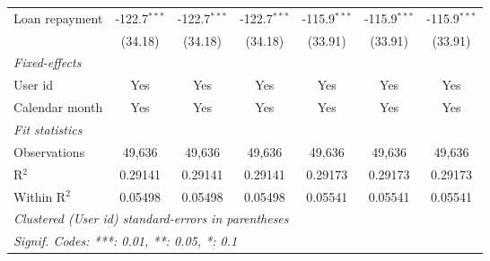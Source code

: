 \begin{table}[htbp]
\begin{footnotesize}
\begin{tabular}{lcccccc}
         Loan repayment                   & -122.7$^{***}$ & -122.7$^{***}$ & -122.7$^{***}$ & -115.9$^{***}$ & -115.9$^{***}$  & -115.9$^{***}$\\
                                          & (34.18)        & (34.18)        & (34.18)        & (33.91)        & (33.91)         & (33.91)\\
         \midrule \emph{Fixed-effects} &   &   &   &   &   &  \\
         User id                          & Yes            & Yes            & Yes            & Yes            & Yes             & Yes\\
         Calendar month                   & Yes            & Yes            & Yes            & Yes            & Yes             & Yes\\
         \midrule \emph{Fit statistics} &   &   &   &   &   &  \\
         Observations                     & 49,636         & 49,636         & 49,636         & 49,636         & 49,636          & 49,636\\
         R$^2$                            & 0.29141        & 0.29141        & 0.29141        & 0.29173        & 0.29173         & 0.29173\\
         Within R$^2$                     & 0.05498        & 0.05498        & 0.05498        & 0.05541        & 0.05541         & 0.05541\\
         \midrule\midrule\multicolumn{7}{l}{\emph{Clustered (User id) standard-errors in parentheses}}\\
         \multicolumn{7}{l}{\emph{Signif. Codes: ***: 0.01, **: 0.05, *: 0.1}}\\
      \end{tabular}
   \end{footnotesize}
\end{table}


